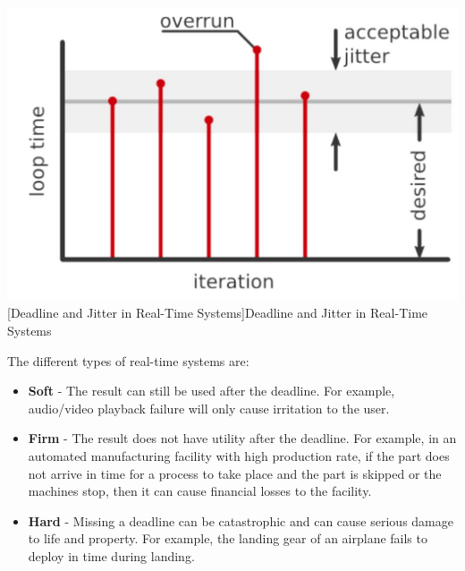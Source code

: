 \documentclass[%
xelatex,
	oneside,		%
	12pt,			%
	parskip=half,	%
	abstracton,
	chapterprefix=true%
    appendixprefix=true]
{scrbook}
\begin{document}
	\begin{center}
\includegraphics[scale=0.4]{fig/deadline.jpg}
[Deadline and Jitter in Real-Time Systems]{Deadline and Jitter in Real-Time Systems\cite{deadline}}
\label{fig:deadline}
\end{center}
	The different types of real-time systems are:
	\begin{itemize}
\item	{\bfseries Soft} - The result can still be used after the deadline. For example, audio/video playback failure will only cause irritation to the user.
\item	{\bfseries	Firm} - The result does not have utility after the deadline. For example, in an automated manufacturing facility with high production rate, if the part does not arrive in time for a process to take place and the part is skipped or the machines stop, then it can cause financial losses to the facility.
\item	{\bfseries	Hard} - Missing a deadline can be catastrophic and can cause serious damage to life and property. For example, the landing gear of an airplane fails to deploy in time during landing.
	\end{itemize}
	
	
	\vspace*{0.5cm}	
	
	
\end{document}
